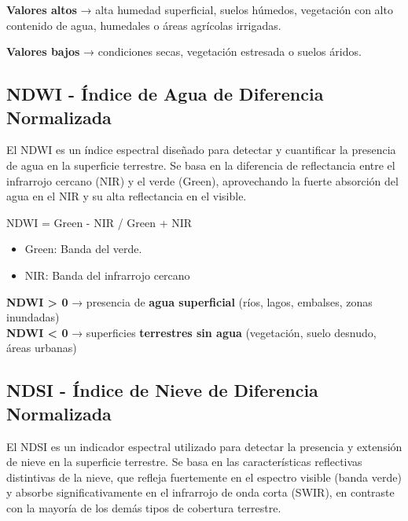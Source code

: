 \documentclass[
]{book}
\providecommand{\tightlist}{%
  \setlength{\itemsep}{0pt}\setlength{\parskip}{0pt}}
\begin{document}
\textbf{Valores altos} → alta humedad superficial, suelos húmedos, vegetación con alto contenido de agua, humedales o áreas agrícolas irrigadas.

\textbf{Valores bajos} → condiciones secas, vegetación estresada o suelos áridos.

\subsection{\texorpdfstring{\textbf{NDWI} - Índice de Agua de Diferencia Normalizada}{NDWI - Índice de Agua de Diferencia Normalizada}}\label{ndwi---uxedndice-de-agua-de-diferencia-normalizada}

El NDWI es un índice espectral diseñado para detectar y cuantificar la presencia de agua en la superficie terrestre. Se basa en la diferencia de reflectancia entre el infrarrojo cercano (NIR) y el verde (Green), aprovechando la fuerte absorción del agua en el NIR y su alta reflectancia en el visible.

NDWI = Green - NIR / Green + NIR\hspace{0pt}

\begin{itemize}
\tightlist
\item
  Green: Banda del verde.\\
\item
  NIR: Banda del infrarrojo cercano
\end{itemize}

\textbf{NDWI \textgreater{} 0} → presencia de \textbf{agua superficial} (ríos, lagos, embalses, zonas inundadas)\\
\textbf{NDWI \textless{} 0} → superficies \textbf{terrestres sin agua} (vegetación, suelo desnudo, áreas urbanas)

\subsection{\texorpdfstring{\textbf{NDSI} - Índice de Nieve de Diferencia Normalizada}{NDSI - Índice de Nieve de Diferencia Normalizada}}\label{ndsi---uxedndice-de-nieve-de-diferencia-normalizada}

El NDSI es un indicador espectral utilizado para detectar la presencia y extensión de nieve en la superficie terrestre. Se basa en las características reflectivas distintivas de la nieve, que refleja fuertemente en el espectro visible (banda verde) y absorbe significativamente en el infrarrojo de onda corta (SWIR), en contraste con la mayoría de los demás tipos de cobertura terrestre.
\end{document}
